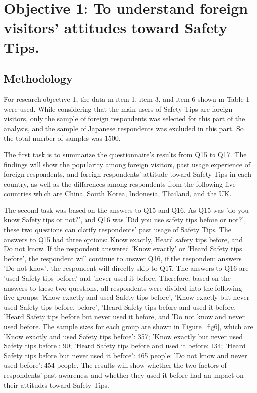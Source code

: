 \chapter{Objective 1: To understand foreign visitors' attitudes toward Safety Tips.}
\label{c4}

\section{Methodology}
For research objective 1, the data in item 1, item 3, and item 6 shown in Table 1 were used. While considering that the main users of Safety Tips are foreign visitors, only the sample of foreign respondents was selected for this part of the analysis, and the sample of Japanese respondents was excluded in this part. So the total number of samples was 1500.

The first task is to summarize the questionnaire's results from Q15 to Q17. The findings will show the popularity among foreign visitors, past usage experience of foreign respondents, and foreign respondents' attitude toward Safety Tips in each country, as well as the differences among respondents from the following five countries which are China, South Korea, Indonesia, Thailand, and the UK.

The second task was based on the answers to Q15 and Q16. As Q15 was 'do you know Safety tips or not?', and Q16 was 'Did you use safety tips before or not?', these two questions can clarify respondents' past usage of Safety Tips. The answers to Q15 had three options: Know exactly, Heard safety tips before, and Do not know. If the respondent answered 'Know exactly' or 'Heard Safety tips before', the respondent will continue to answer Q16, if the respondent answers 'Do not know', the respondent will directly skip to Q17. The answers to Q16 are 'used Safety tips before.' and 'never used it before. Therefore, based on the answers to these two questions, all respondents were divided into the following five groups: 'Know exactly and used Safety tips before', 'Know exactly but never used Safety tips before. before', 'Heard Safety tips before and used it before, 'Heard Safety tips before but never used it before, and 'Do not know and never used before. The sample sizes for each group are shown in Figure~\ref{fig6}, which are 'Know exactly and used Safety tips before': 357; 'Know exactly but never used Safety tips before': 90; 'Heard Safety tips before and used it before: 134; 'Heard Safety tips before but never used it before': 465 people; 'Do not know and never used before': 454 people. The results will show whether the two factors of respondents' past awareness and whether they used it before had an impact on their attitudes toward Safety Tips.

